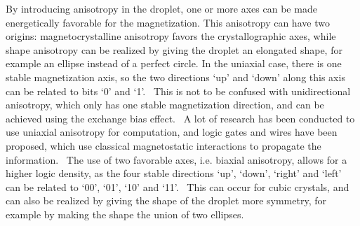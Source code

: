 \documentclass[11pt,a4paper,english]{article}
\begin{document}
By introducing anisotropy in the droplet, one or more axes can be made energetically favorable for the magnetization. This anisotropy can have two origins: magnetocrystalline anisotropy favors the crystallographic axes, while shape anisotropy can be realized by giving the droplet an elongated shape, for example an ellipse instead of a perfect circle. In the uniaxial case, there is one stable magnetization axis, so the two directions `up' and `down' along this axis can be related to bits `0' and `1'.~\cite{MQCA_RoomTemp} This is not to be confused with unidirectional anisotropy, which only has one stable magnetization direction, and can be achieved using the exchange bias effect.~\cite{ExchangeBias_Mechanisms,ExchangeBias_nanostructures,ExchangeBias} A lot of research has been conducted to use uniaxial anisotropy for computation, and logic gates and wires have been proposed, which use classical magnetostatic interactions to propagate the information.~\cite{GYP-18,MQCA_MajorityGate,SwitchingForced_EnergyEfficient} The use of two favorable axes, i.e. biaxial anisotropy, allows for a higher logic density, as the four stable directions `up', `down', `right' and `left' can be related to `00', `01', `10' and `11'.~\cite{MQCA_ImageRecognition} This can occur for cubic crystals, and can also be realized by giving the shape of the droplet more symmetry, for example by making the shape the union of two ellipses.
\end{document}
